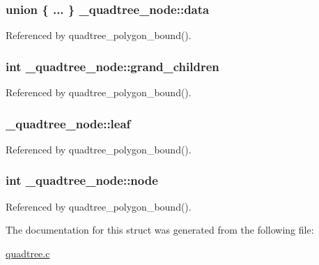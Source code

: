 \subsubsection[{\texorpdfstring{data}{data}}]{\setlength{\rightskip}{0pt plus 5cm}union \{ ... \}   \+\_\+quadtree\+\_\+node\+::data}\hypertarget{struct__quadtree__node_a443be2ffd807ed9551ed1fc61b21276f}{}\label{struct__quadtree__node_a443be2ffd807ed9551ed1fc61b21276f}


Referenced by quadtree\+\_\+polygon\+\_\+bound().

\subsubsection[{\texorpdfstring{grand\+\_\+children}{grand_children}}]{\setlength{\rightskip}{0pt plus 5cm}int \+\_\+quadtree\+\_\+node\+::grand\+\_\+children}\hypertarget{struct__quadtree__node_a440a869717a3b5d9700101d013f397e6}{}\label{struct__quadtree__node_a440a869717a3b5d9700101d013f397e6}


Referenced by quadtree\+\_\+polygon\+\_\+bound().

\subsubsection[{\texorpdfstring{leaf}{leaf}}]{ \+\_\+quadtree\+\_\+node\+::leaf}\hypertarget{struct__quadtree__node_a3f18cf00c4055c9474dad3ca25f4b6f4}{}\label{struct__quadtree__node_a3f18cf00c4055c9474dad3ca25f4b6f4}


Referenced by quadtree\+\_\+polygon\+\_\+bound().

\subsubsection[{\texorpdfstring{node}{node}}]{\setlength{\rightskip}{0pt plus 5cm}int \+\_\+quadtree\+\_\+node\+::node}\hypertarget{struct__quadtree__node_a34ce0a3ded8087cfbe58e637f07d2dc3}{}\label{struct__quadtree__node_a34ce0a3ded8087cfbe58e637f07d2dc3}


Referenced by quadtree\+\_\+polygon\+\_\+bound().



The documentation for this struct was generated from the following file\+:\begin{DoxyCompactItemize}
\item 
\hyperlink{quadtree_8c}{quadtree.\+c}\end{DoxyCompactItemize}
